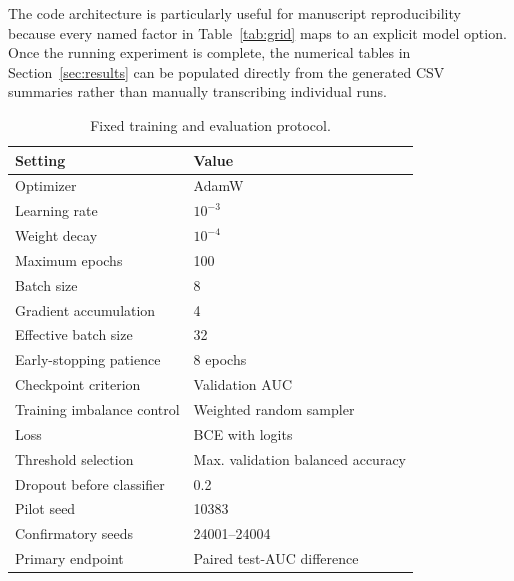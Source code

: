 \documentclass[journal]{IEEEtran}
\begin{document}
The code architecture is particularly useful for manuscript reproducibility because every named factor in Table~\ref{tab:grid} maps to an explicit model option. Once the running experiment is complete, the numerical tables in Section~\ref{sec:results} can be populated directly from the generated CSV summaries rather than manually transcribing individual runs.

\begin{table}[t]
\centering
\caption{Fixed training and evaluation protocol.}
\label{tab:training}
\scriptsize
\begin{tabular}{ll}
\toprule
Setting & Value \\
\midrule
Optimizer & AdamW \\
Learning rate & $10^{-3}$ \\
Weight decay & $10^{-4}$ \\
Maximum epochs & 100 \\
Batch size & 8 \\
Gradient accumulation & 4 \\
Effective batch size & 32 \\
Early-stopping patience & 8 epochs \\
Checkpoint criterion & Validation AUC \\
Training imbalance control & Weighted random sampler \\
Loss & BCE with logits \\
Threshold selection & Max. validation balanced accuracy \\
Dropout before classifier & 0.2 \\
Pilot seed & 10383 \\
Confirmatory seeds & 24001--24004 \\
Primary endpoint & Paired test-AUC difference \\
\bottomrule
\end{tabular}
\end{table}
\end{document}
